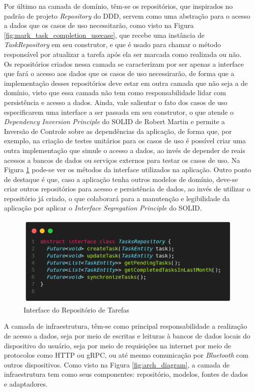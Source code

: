 \documentclass[12pt, %
openright, 
oneside, %
a4paper,    %
brazil]{facom-ufu-abntex2}
\begin{document}
Por último na camada de domínio, têm-se os repositórios, que inspirados no padrão de projeto \textit{Repository} do DDD, servem como uma abstração para o acesso a dados que os casos de uso necessitarão, como visto na Figura \ref{fig:mark_task_completion_usecase}, que recebe uma instância de \textit{TaskRepository} em seu construtor, e que é usado para chamar o método responsável por atualizar a tarefa após ela ser marcada como realizada ou não. Os repositórios criados nessa camada se caracterizam por ser apenas a interface que fará o acesso aos dados que os casos de uso necessirarão, de forma que a implementação desses repositórios deve estar em outra camada que não seja a de domínio, visto que essa camada não tem como responsabilidade lidar com persistência e acesso a dados. Ainda, vale salientar o fato dos casos de uso especificarem uma interface a ser passada em seu construtor, o que atende o \textit{Dependency Inversion Principle} do SOLID de Robert Martin e permite a Inversão de Controle sobre as dependências da aplicação, de forma que, por exemplo, na criação de testes unitários para os casos de uso é possível criar uma outra implementação que simule o acesso a dados, ao invés de depender de reais acessos a bancos de dados ou serviços externos para testar os casos de uso. Na Figura \ref{fig:tasks_repository} pode-se ver os métodos da interface utilizados na aplicação. Outro ponto de destaque é que, caso a aplicação tenha outros modelos de domínio, deve-se criar outros repositórios para acesso e persistência de dados, ao invés de utilizar o repositório já criado, o que colaborará para a manutenção e legibilidade da aplicação por aplicar o \textit{Interface Segregation Principle} do SOLID.

\begin{figure}[ht]
    \centering
    \includegraphics[width=.65\textwidth, trim={0 30 0 100}, clip]{figures/arch/tasks_repository.png}
    \caption{Interface do Repositório de Tarefas}
    \label{fig:tasks_repository}
\end{figure}

A camada de infraestrutura, têm-se como principal responsabilidade a realização de acesso a dados, seja por meio de escritas e leituras à bancos de dados locais do dispositivo do usuário, seja por meio de requisições na internet por meio de protocolos como HTTP ou gRPC, ou até mesmo comunicação por \textit{Bluetooth} com outros dispositivos. Como visto na Figura \ref{fig:arch_diagram}, a camada de infraestrutura tem como seus componentes: repositório, modelos, fontes de dados e adaptadores.
\end{document}

